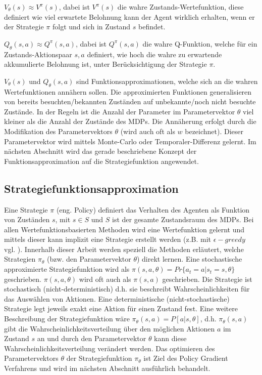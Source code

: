 \documentclass[conference]{IEEEtran}
\begin{document}
$V_{\theta}(s) \approx V^{\pi}(s)$, dabei ist $V^{\pi}(s)$ die wahre Zustands-Wertefunktion, diese definiert wie viel erwartete Belohnung kann der Agent wirklich erhalten, wenn er der Strategie $\pi$ folgt und sich in Zustand $s$ befindet.

$Q_{\theta}(s, a) \approx Q^{\pi}(s, a)$, dabei ist $Q^{\pi}(s, a)$ die wahre Q-Funktion, welche für ein Zustands-Aktionspaar $s, a$ definiert, wie hoch die wahre zu erwartende akkumulierte Belohnung ist, unter Berücksichtigung der Strategie $\pi$.

$V_{\theta}(s)$ und $Q_{\theta}(s, a)$ sind Funktionsapproximationen, welche sich an die wahren Wertefunktionen annähern sollen. Die approximierten Funktionen generalisieren von bereits besuchten/bekannten Zuständen auf unbekannte/noch nicht besuchte Zustände. In der Regeln ist die Anzahl der Parameter im Parametervektor $\theta$ viel kleiner als die Anzahl der Zustände des MDPs. Die Annäherung erfolgt durch die Modifikation des Parametervektors $\theta$ (wird auch oft als $w$ bezeichnet). Dieser Parametervektor wird mittels Monte-Carlo oder Temporaler-Differenz gelernt. Im nächsten Abschnitt wird das gerade beschriebene Konzept der Funktionsapproximation auf die Strategiefunktion angewendet.
%

\subsection{Strategiefunktionsapproximation}
Eine Strategie $\pi$ (eng. Policy) definiert das Verhalten des Agenten als Funktion von Zuständen $s$, mit $s \in S$ und $S$ ist der gesamte Zustandsraum des MDPs. Bei allen Wertefunktionsbasierten Methoden wird eine Wertefunktion gelernt und mittels dieser kann implizit eine Strategie erstellt werden (z.B. mit $\epsilon-greedy$ vgl. \cite{silver_15}). Innerhalb dieser Arbeit werden speziell die Methoden erläutert, welche Strategien $\pi_\theta$ (bzw. den Parametervektor $\theta$) direkt lernen. Eine stochastische approximierte Strategiefunktion wird als $\pi(s,a,\theta) = Pr \{ a_t = a | s_t = s, \theta \}$ geschrieben. $\pi(s,a,\theta)$ wird oft auch als $\pi(s,a)$ geschrieben. Die Strategie ist stochastisch (nicht-deterministisch) d.h. sie beschreibt Wahrscheinlichkeiten für das Auswählen von Aktionen. Eine deterministische (nicht-stochastische) Strategie legt jeweils exakt eine Aktion für einen Zustand fest. Eine weitere Beschreibung der Strategiefunktion wäre $\pi_\theta (s,a) = P[a|s,\theta]$, d.h. $\pi_\theta (s,a)$ gibt die Wahrscheinlichkeitsverteilung über den möglichen Aktionen $a$ im Zustand $s$ an und durch den Parametervektor $\theta$ kann diese Wahrscheinlichkeitsverteilung verändert werden. Das optimieren des Parametervektors $\theta$ der Strategiefunktion $\pi_\theta$ ist Ziel des Policy Gradient Verfahrens und wird im nächsten Abschnitt ausführlich behandelt. 
\end{document}
